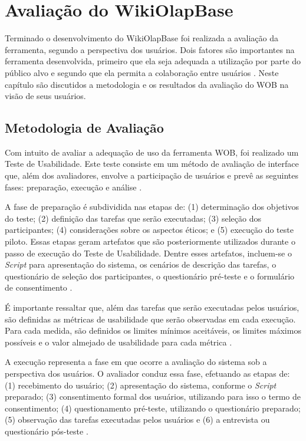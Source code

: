 \chapter{Avaliação do WikiOlapBase}
\label{chap:avaliacao}

Terminado o desenvolvimento do WikiOlapBase foi realizada a avaliação da ferramenta, segundo
a perspectiva dos usuários. Dois fatores são importantes na ferramenta desenvolvida, primeiro 
que ela seja adequada a utilização por parte do público alvo e segundo que ela permita a 
colaboração entre usuários \cite{barbosa2010}. Neste capítulo são discutidos a 
metodologia e os resultados da avaliação do WOB na visão de seus usuários.

\section{Metodologia de Avaliação}
\label{sec:metodologia-avaliacao}

Com intuito de avaliar a adequação de uso da ferramenta WOB, foi realizado um Teste de 
Usabilidade. Este teste consiste em um método de avaliação de interface que, além dos 
avaliadores, envolve a participação de usuários e prevê as seguintes fases: preparação, 
execução e análise \cite{barbosa2010}.

A fase de preparação é subdividida nas etapas de: (1) determinação dos objetivos do teste; 
(2) definição das tarefas que serão executadas; (3) seleção dos participantes; (4) 
considerações sobre os aspectos éticos; e (5) execução do teste piloto. Essas etapas geram 
artefatos que são posteriormente utilizados durante o passo de execução do Teste de 
Usabilidade. Dentre esses artefatos, incluem-se o \textit{Script} para apresentação do sistema, 
os  cenários de descrição das tarefas, o questionário de seleção dos participantes, o 
questionário pré-teste e o formulário de consentimento \cite{barbosa2010}.

É importante ressaltar que, além das tarefas que serão executadas pelos usuários, são 
definidas as métricas de usabilidade que serão observadas em cada execução. Para cada 
medida, são definidos os limites mínimos aceitáveis, os limites máximos possíveis e o 
valor almejado de usabilidade para cada métrica \cite{barbosa2010}.

A execução representa a fase em que ocorre a avaliação do sistema sob a perspectiva dos 
usuários. O avaliador conduz essa fase, efetuando as etapas de: (1) recebimento do usuário; 
(2) apresentação do sistema, conforme o \textit{Script} preparado; (3) consentimento formal 
dos usuários, utilizando para isso o termo de consentimento; (4) questionamento pré-teste, 
utilizando o questionário preparado; (5) observação das tarefas executadas pelos usuários e 
(6) a entrevista ou questionário pós-teste \cite{barbosa2010}.

